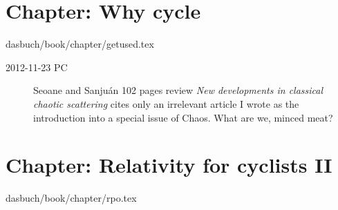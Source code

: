\section{Chapter: Why cycle}
\label{c-getused}\noindent dasbuch/book/chapter/getused.tex

\begin{description}

\item[2012-11-23 PC] Seoane and Sanju\'an
{102 pages review} {\em New developments in classical chaotic scattering}
cites only an irrelevant article I wrote as the
introduction into a special issue of Chaos. What are we, minced meat?

\end{description}


%
%
%
%
\section{Chapter: Relativity for cyclists II}
\label{c-rpo}\noindent dasbuch/book/chapter/rpo.tex

